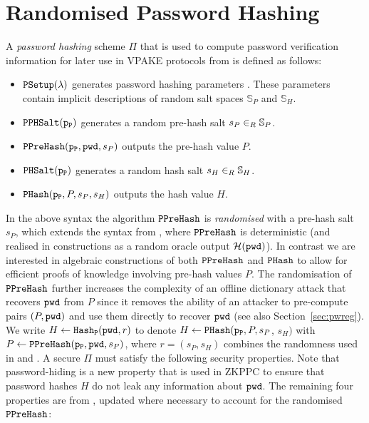 
\section{Randomised Password Hashing} \label{sec:strucphash}
A \emph{password hashing} scheme $\Pi$ that is used to compute password verification information for later use in VPAKE protocols from \cite{BenhamoudaP13} is defined as follows:
\begin{itemize}
	\item $\mathtt{PSetup}(\lambda)$ generates password hashing parameters \paramP. These parameters contain implicit descriptions of random salt spaces $\mathbb{S}_P$ and $\mathbb{S}_H$.
	\item $\mathtt{PPHSalt}(\mathtt{p_P})$ generates a random pre-hash salt $s_P\in_R\mathbb{S}_P$.
	\item $\mathtt{PPreHash}(\mathtt{p_P}, \mathtt{pwd}, s_P)$ outputs the pre-hash value $P$.
	\item $\mathtt{PHSalt}(\mathtt{p_P})$ generates a random hash salt $s_H\in_R\mathbb{S}_H$.
	\item $\mathtt{PHash}(\mathtt{p_P}, P, s_P, s_H)$ outputs the hash value $H$.
\end{itemize}
In the above syntax the algorithm $\mathtt{PPreHash}$ is \emph{randomised} with a pre-hash salt $s_P$, which extends the syntax from \cite{BenhamoudaP13}, where $\mathtt{PPreHash}$ is deterministic (and realised in constructions as a random oracle output $\mathcal{H}(\mathtt{pwd})$). In contrast we are interested in algebraic constructions of both $\mathtt{PPreHash}$ and $\mathtt{PHash}$ to allow for efficient proofs of knowledge involving pre-hash values $P$. The randomisation of $\mathtt{PPreHash}$ further increases the complexity of an offline dictionary attack that recovers $\mathtt{pwd}$ from $P$ since it removes the ability of an attacker to pre-compute pairs $(P,\mathtt{pwd})$ and use them directly to recover $\mathtt{pwd}$ (see also Section~\ref{sec:pwreg}). We write $H\gets \mathtt{Hash_P}(\mathtt{pwd},r)$ to denote $H\gets \mathtt{PHash}(\mathtt{p_P},P,s_P$, $s_H)$ with $P\gets\mathtt{PPreHash}(\mathtt{p_P},\mathtt{pwd},s_P)$, where $r=(s_P,s_H)$ combines the randomness used in \PHash and \PPreHash. A secure $\Pi$ must satisfy the following security properties. Note that password-hiding is a new property that is used in ZKPPC to ensure that password hashes $H$ do not leak any information about $\mathtt{pwd}$. The remaining four properties are from \cite{BenhamoudaP13}, updated where necessary to account for the randomised $\mathtt{PPreHash}$:
